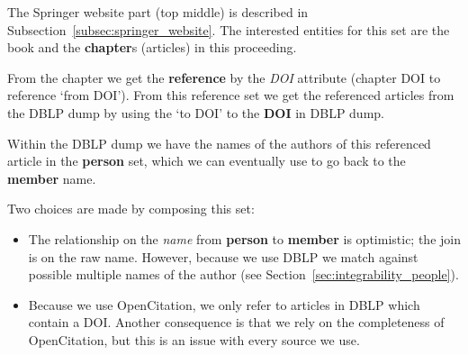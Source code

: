 \documentclass{ou-report}
\newcommand{\doi}{{DOI}}
\newcommand{\dblp}{DBLP}
\begin{document}
The Springer website part (top middle) is described in 
Subsection~\ref{subsec:springer_website}. The interested entities for this set
are the book and the \textbf{chapter}s (articles) in this proceeding. 

From the chapter we get the \textbf{reference} by the \textit{\doi{}} attribute 
(chapter \doi{} to reference `from \doi{}'). From this reference set we get the 
referenced articles from the \dblp{} dump by using the `to \doi{}' to the 
\textbf{\doi{}} in \dblp{} dump.

Within the \dblp{} dump we have the names of the authors
of this referenced article in the \textbf{person} set, which we can eventually use 
to go back to the \textbf{member} name.

Two choices are made by composing this set:
\begin{itemize}
    \item The relationship on the \textit{name} from \textbf{person} to 
        \textbf{member} is optimistic; the join is on the raw name. 
        However, because we use \dblp{} we match against possible multiple names
        of the author (see Section~\ref{sec:integrability_people}).
    \item Because we use OpenCitation, we only refer to articles in \dblp{} which 
        contain a \doi{}. Another consequence is that we rely on the completeness of
        OpenCitation, but this is an issue with every source we use.
\end{itemize}



\end{document}
